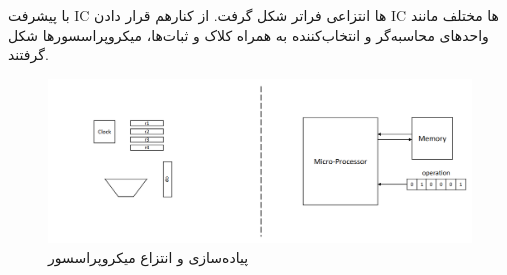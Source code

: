 \begin{flushright}
    با پیشرفت IC ها انتزاعی فراتر شکل گرفت.
    از کنارهم قرار دادن IC ها مختلف مانند واحدهای محاسبه‌گر و انتخاب‌کننده به همراه کلاک و ثبات‌ها، میکروپراسسورها شکل گرفتند.

    \begin{figure}[H]
               \centering
               \includegraphics[scale=0.3]{source/microprocessor-imp&abs}
               \caption{پیاده‌سازی و انتزاع میکروپراسسور}
               \label{fig:microprocessor-imp&abs}
    \end{figure}


\end{flushright}